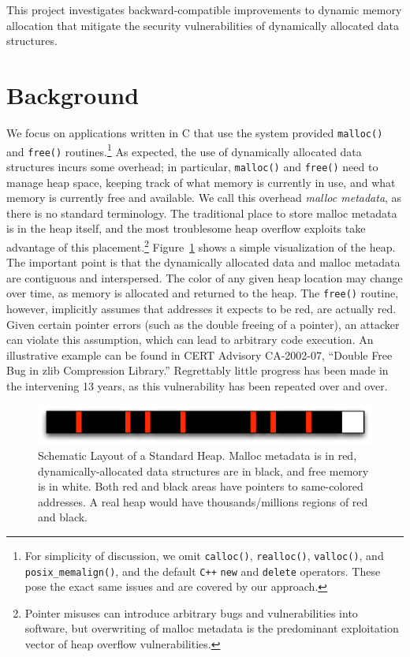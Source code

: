 \documentclass[12pt]{cslreport}
\begin{document}
This project investigates backward-compatible improvements to dynamic
memory allocation that mitigate the security vulnerabilities of
dynamically allocated data structures.

\section{Background}


We focus on applications written in C that use the system provided
\texttt{malloc()} and \texttt{free()} routines.\footnote{For
  simplicity of discussion, we omit \texttt{calloc()},
  \texttt{realloc()}, \texttt{valloc()}, and
  \texttt{posix\_memalign()}, and the default \texttt{C++}
  \texttt{new} and \texttt{delete} operators. These pose the exact
  same issues and are covered by our approach.}  As expected, the use
of dynamically allocated data structures incurs some overhead; in
particular, \texttt{malloc()} and \texttt{free()} need to manage heap
space, keeping track of what memory is currently in use, and what
memory is currently free and available.  We call this overhead
\emph{malloc metadata\/}, as there is no standard terminology.  The
traditional place to store malloc metadata is in the heap itself, and the most troublesome
heap overflow exploits take advantage of this placement.\footnote{Pointer misuses can introduce
  arbitrary bugs and vulnerabilities into software, but overwriting of
  malloc metadata is the predominant exploitation vector of heap
  overflow vulnerabilities.} Figure~\ref{heap-example} shows a
simple visualization of the heap.  The important point is that the
dynamically allocated data and malloc metadata are contiguous and
interspersed. The color of any given heap location may change over
time, as memory is allocated and returned to the heap.  The
\texttt{free()} routine, however, implicitly assumes that addresses it
expects to be red, are actually red. Given certain pointer errors
(such as the double freeing of a pointer), an attacker can violate
this assumption, which can lead to arbitrary code execution.  An
illustrative example can be found in CERT Advisory CA-2002-07,
``Double Free Bug in zlib Compression Library.'' Regrettably little
progress has been made in the intervening 13 years, as this
vulnerability has been repeated over and over.

\begin{figure}
\begin{center}
\includegraphics{heap-example}
\end{center}
\caption[Schematic Layout of a Standard Heap]{Schematic Layout of a
  Standard Heap. Malloc metadata is in red, dynamically-allocated data
  structures are in black, and free memory is in white. Both red and
  black areas have pointers to same-colored addresses. A real heap
  would have thousands/millions regions of red and black.}
\label{heap-example}
\end{figure}
\end{document}
